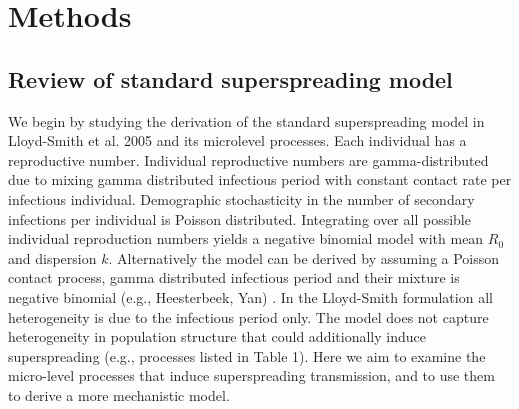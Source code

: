 \documentclass{imammb}
\numberwithin{equation}{section}
\begin{document}
\section{Methods}

\subsection{Review of standard superspreading model}

We begin by studying the derivation of the standard superspreading model in Lloyd-Smith et al. 2005 and its microlevel processes. 
Each individual has a reproductive number. Individual reproductive numbers are gamma-distributed due to mixing gamma distributed infectious period with constant contact rate per infectious individual. Demographic stochasticity in the number of secondary infections per individual is Poisson distributed. Integrating over all possible individual reproduction numbers yields a negative binomial model with mean $R_0$ and dispersion $k$. Alternatively the model can be derived by assuming a Poisson contact process, gamma distributed infectious period and their mixture is negative binomial (e.g., Heesterbeek, Yan) . In the Lloyd-Smith formulation all heterogeneity is due to the infectious period only. The model does not capture heterogeneity in population structure that could additionally induce superspreading (e.g., processes listed in Table 1). Here we aim to examine the micro-level processes that induce superspreading transmission, and to use them to derive a more mechanistic model. 

\end{document}
